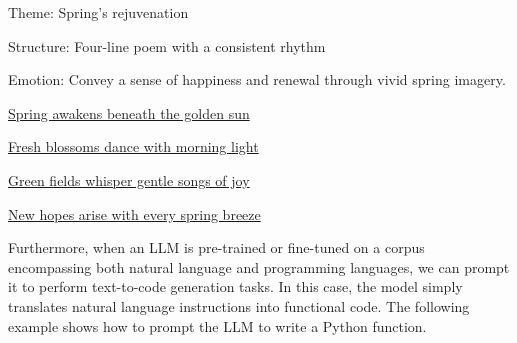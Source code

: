 \vspace{0.5em}
\begin{tcolorbox}

\begingroup
\setlength{\leftskip}{2em}
\setlength{\rightskip}{2em}


\vspace{0.7em}

Theme: Spring's rejuvenation

\vspace{0.3em}

Structure: Four-line poem with a consistent rhythm

\vspace{0.3em}

Emotion: Convey a sense of happiness and renewal through vivid spring imagery.

\vspace{1.0em}

\underline{Spring awakens beneath the golden sun}

\vspace{0.7em}

\underline{Fresh blossoms dance with morning light}

\vspace{0.3em}

\underline{Green fields whisper gentle songs of joy}

\vspace{0.3em}

\underline{New hopes arise with every spring breeze}

\endgroup

\end{tcolorbox}
\vspace{0.5em}

Furthermore, when an LLM is pre-trained or fine-tuned on a corpus encompassing both natural language and programming languages, we can prompt it to perform text-to-code generation tasks. In this case, the model simply translates natural language instructions into functional code. The following example shows how to prompt the LLM to write a Python function.

